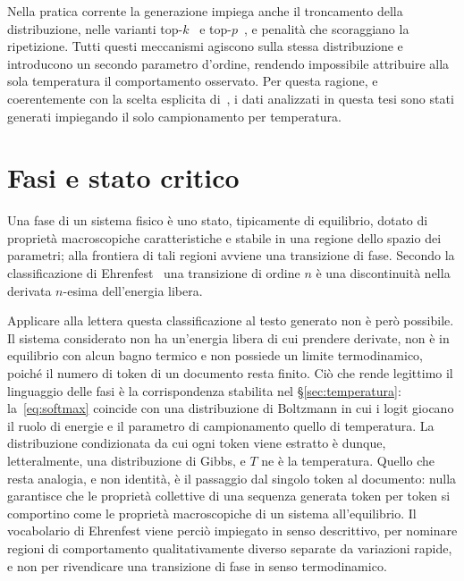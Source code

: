 Nella pratica corrente la generazione impiega anche il troncamento della
distribuzione, nelle varianti top-$k$~\cite{fan2018} e
top-$p$~\cite{holtzman2020}, e penalità che scoraggiano la ripetizione. Tutti
questi meccanismi agiscono sulla stessa distribuzione e introducono un secondo
parametro d'ordine, rendendo impossibile attribuire alla sola temperatura il
comportamento osservato. Per questa ragione, e coerentemente con la scelta
esplicita di~\cite{mikhaylovskiy2025zipf}, i dati analizzati in questa tesi sono
stati generati impiegando il solo campionamento per temperatura.


\section{Fasi e stato critico}
\label{sec:fasi}

Una fase di un sistema fisico è uno stato, tipicamente di equilibrio, dotato di
proprietà macroscopiche caratteristiche e stabile in una regione dello spazio
dei parametri; alla frontiera di tali regioni avviene una transizione di fase.
Secondo la classificazione di Ehrenfest~\cite{ehrenfest1933} una transizione di
ordine $n$ è una discontinuità nella derivata $n$-esima dell'energia libera.

Applicare alla lettera questa classificazione al testo generato non è però
possibile. Il sistema considerato non ha un'energia libera di cui prendere
derivate, non è in equilibrio con alcun bagno termico e
non possiede un limite termodinamico, poiché il numero di token di un documento
resta finito. Ciò che rende legittimo il linguaggio delle fasi è la
corrispondenza stabilita nel §\ref{sec:temperatura}: la~\eqref{eq:softmax}
coincide con una distribuzione di Boltzmann in cui i logit giocano il ruolo di
energie e il parametro di campionamento quello di temperatura. La distribuzione
condizionata da cui ogni token viene estratto è dunque, letteralmente, una
distribuzione di Gibbs, e $T$ ne è la temperatura. Quello che resta analogia, e
non identità, è il passaggio dal singolo token al documento: nulla garantisce
che le proprietà collettive di una sequenza generata token per token si
comportino come le proprietà macroscopiche di un sistema all'equilibrio. Il
vocabolario di Ehrenfest viene perciò impiegato in senso descrittivo, per
nominare regioni di comportamento qualitativamente diverso separate da
variazioni rapide, e non per rivendicare una transizione di fase in senso
termodinamico.

